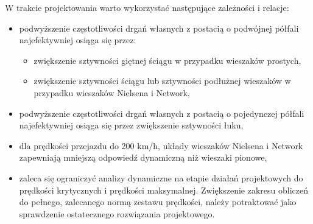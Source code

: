 \noindent
W trakcie projektowania warto wykorzystać następujące zależności i relacje:
\begin{itemize}
	\item podwyższenie częstotliwości drgań własnych z postacią o podwójnej półfali najefektywniej osiąga się przez: 
	\begin{itemize}
	\item zwiększenie sztywności giętnej ściągu w przypadku wieszaków prostych, 
	\item zwiększenie sztywności ściągu lub sztywności podłużnej wieszaków w przypadku wieszaków Nielsena i Network,
	\end{itemize}
	\item podwyższenie częstotliwości drgań własnych z postacią o pojedynczej półfali najefektywniej osiąga się przez zwiększenie sztywności łuku,
	\item dla prędkości przejazdu do 200 km/h, układy wieszaków Nielsena i Network zapewniają mniejszą odpowiedź dynamiczną niż wieszaki pionowe,
	\item zaleca się ograniczyć analizy dynamiczne na etapie działań projektowych do prędkości krytycznych i prędkości maksymalnej. Zwiększenie zakresu obliczeń do pełnego, zalecanego normą zestawu prędkości, należy potraktować jako sprawdzenie ostatecznego rozwiązania projektowego.
\end{itemize}


